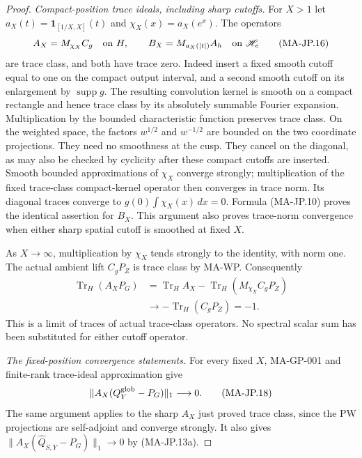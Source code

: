 \begin{proof}
\emph{Compact-position trace ideals, including sharp cutoffs.}
For $X>1$ let
$a_X(t)=\mathbf1_{[1/X,X]}(t)$ and
$\chi_X(x)=a_X(e^x)$.
The operators
\[
 A_X=M_{\chi_X}C_g\quad\hbox{on }H,\qquad
 B_X=M_{a_X(|t|)}A_h\quad\hbox{on }\mathscr H_e
 \tag{MA-JP.16}
\]
are trace class, and both have trace zero.
Indeed insert a fixed smooth cutoff equal to one
on the compact output interval, and a second smooth
cutoff on its enlargement by $\operatorname{supp}g$.
The resulting convolution kernel is smooth on a compact
rectangle and hence trace class by its absolutely
summable Fourier expansion.  Multiplication by the
bounded characteristic function preserves trace class.
On the weighted space, the factors $w^{1/2}$ and
$w^{-1/2}$ are bounded on the two coordinate
projections.  They need no smoothness at the cusp.
They cancel on the diagonal, as may also be checked
by cyclicity after these compact cutoffs are inserted.
Smooth bounded approximations of $\chi_X$ converge
strongly; multiplication of the fixed trace-class
compact-kernel operator then converges in trace norm.
Its diagonal traces converge to
$g(0)\int\chi_X(x)\,dx=0$.
Formula (MA-JP.10) proves the identical assertion for
$B_X$.  This argument also proves trace-norm convergence
when either sharp spatial cutoff is smoothed at fixed $X$.

As $X\to\infty$, multiplication by $\chi_X$ tends
strongly to the identity, with norm one.  The actual
ambient lift $C_gP_Z$ is trace class by MA-WP.
Consequently
\[
 \begin{split}
 \operatorname{Tr}_H(A_XP_G)
 &=\operatorname{Tr}_H A_X-
            \operatorname{Tr}_H(M_{\chi_X}C_gP_Z)\\
 &\longrightarrow-\operatorname{Tr}_H(C_gP_Z)=-1.
 \end{split}
 \tag{MA-JP.17}
\]
This is a limit of traces of actual trace-class
operators.  No spectral scalar sum has been
substituted for either cutoff operator.

\emph{The fixed-position convergence statements.}
For every fixed $X$, MA-GP-001 and finite-rank
trace-ideal approximation give
\[
            \|A_X(Q_Y^{\rm glob}-P_G)\|_1\longrightarrow0 .
 \tag{MA-JP.18}
\]
The same argument applies to the sharp $A_X$ just
proved trace class, since the PW projections are
self-adjoint and converge strongly.
It also gives
$\|A_X(\widehat Q_{S,Y}-P_G)\|_1\to0$
by (MA-JP.13a).


\end{proof}
